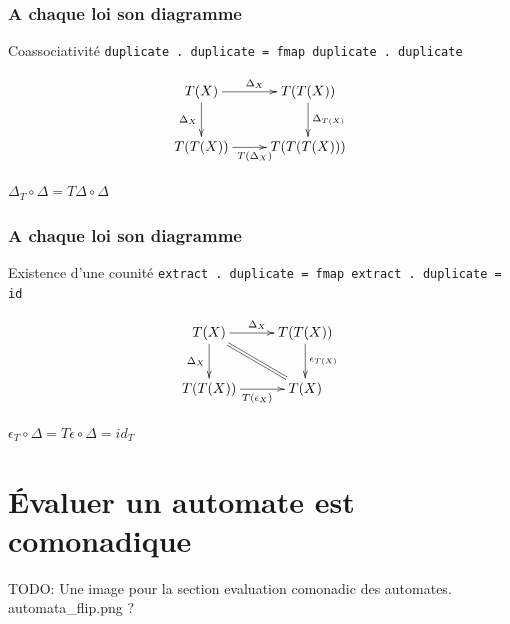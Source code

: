 \documentclass{beamer}
\begin{document}
\begin{frame}
\frametitle{A chaque loi son diagramme}
\begin{alertblock}{Coassociativité}
\verb!duplicate . duplicate = fmap duplicate . duplicate!
\end{alertblock}

\begin{block}{}

\[
\xymatrix{
T(X) \ar[r]^{\Delta_X} \ar[d]_{\Delta_X} & T(T(X)) \ar[d]^{\Delta_{T(X)}} \\
T(T(X)) \ar[r]_{T(\Delta_X)} & T(T(T(X))) \\
}
\]
\end{block}

\begin{block}{}
\begin{center}
$\Delta_T \circ \Delta = T\Delta \circ \Delta$
\end{center}
\end{block}

\end{frame}

\begin{frame}
\frametitle{A chaque loi son diagramme}
\begin{alertblock}{Existence d'une counité}
\verb!extract . duplicate = fmap extract . duplicate = id!
\end{alertblock}

\begin{block}{}
\[
\xymatrix{
T(X) \ar[d]_{\Delta_X} \ar[r]^{\Delta_X}  \ar@{=}[dr] & T(T(X))   \ar[d]^{\epsilon_{T(X)}} \\
T(T(X)) \ar[r]_{T(\epsilon_X)} & T(X) \\
}
\]
\end{block}

\begin{block}{}
\begin{center}
$\epsilon_T \circ \Delta = T \epsilon \circ \Delta = id_T$
\end{center}
\end{block}

\end{frame}

\section{Évaluer un automate est comonadique}

\begin{frame}
TODO: Une image pour la section evaluation comonadic des automates. automata\_flip.png ?
\end{frame}
\end{document}
